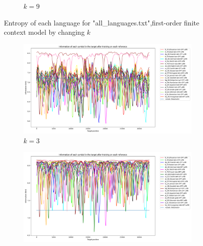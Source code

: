 \documentclass{article}
\begin{document}
\begin{figure}
\begin{subfigure}[b]{0.3\textwidth}
\begin{center}
        \end{center}
        \caption{$k = 9$}
        \label{fig:all_languages_p_c:1:9}
    \end{subfigure}
    
    \caption{Entropy of each language for "all_languages.txt",first-order finite context model by changing $k$}
    \label{fig:all_languages_p_c:k}
\end{figure}

\begin{figure}
    \begin{subfigure}[b]{0.3\textwidth}
        \begin{center}
            \includegraphics[width=1.0\linewidth]{../results/all_languages_random/-p_c:1:3.png}
        \end{center}
        \caption{$k = 3$}
        \label{fig:all_languages_random_p_c:1:3}
    \end{subfigure}
    \hfill
    \begin{subfigure}[b]{0.3\textwidth}
        \begin{center}
            \includegraphics[width=1.0\linewidth]{../results/all_languages_random/-p_c:1:6.png}
        \end{center}

\end{subfigure}
\end{figure}
\end{document}
